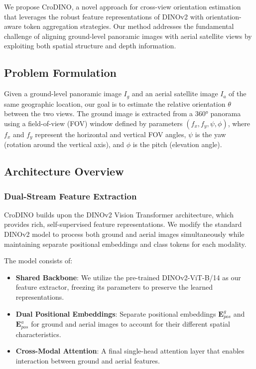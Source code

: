 We propose CroDINO, a novel approach for cross-view orientation estimation that leverages the robust feature representations of DINOv2 with orientation-aware token aggregation strategies. Our method addresses the fundamental challenge of aligning ground-level panoramic images with aerial satellite views by exploiting both spatial structure and depth information.

\subsection{Problem Formulation}

Given a ground-level panoramic image $I_g$ and an aerial satellite image $I_a$ of the same geographic location, our goal is to estimate the relative orientation $\theta$ between the two views. The ground image is extracted from a 360° panorama using a field-of-view (FOV) window defined by parameters $(f_x, f_y, \psi, \phi)$, where $f_x$ and $f_y$ represent the horizontal and vertical FOV angles, $\psi$ is the yaw (rotation around the vertical axis), and $\phi$ is the pitch (elevation angle).

\subsection{Architecture Overview}

\subsubsection{Dual-Stream Feature Extraction}

CroDINO builds upon the DINOv2 Vision Transformer architecture, which provides rich, self-supervised feature representations. We modify the standard DINOv2 model to process both ground and aerial images simultaneously while maintaining separate positional embeddings and class tokens for each modality.

The model consists of:
\begin{itemize}
    \item \textbf{Shared Backbone}: We utilize the pre-trained DINOv2-ViT-B/14 as our feature extractor, freezing its parameters to preserve the learned representations.
    \item \textbf{Dual Positional Embeddings}: Separate positional embeddings $\mathbf{E}_{pos}^g$ and $\mathbf{E}_{pos}^a$ for ground and aerial images to account for their different spatial characteristics.
    \item \textbf{Cross-Modal Attention}: A final single-head attention layer that enables interaction between ground and aerial features.
\end{itemize}

